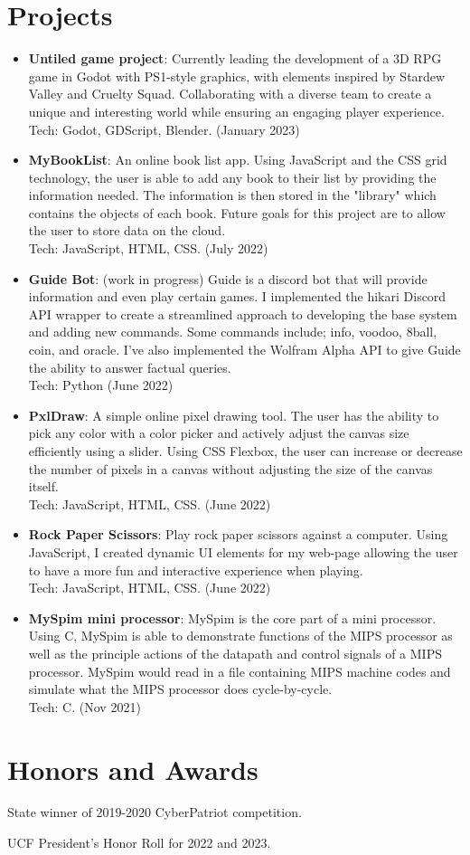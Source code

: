 \documentclass[a4paper,20pt]{article}
\newcommand{\resumeItem}[2]{
  \item\normalsize{
    \textbf{#1}{: #2 \vspace{1pt}}
  }
}
\newcommand{\resumeSubItem}[2]{\resumeItem{#1}{#2}\vspace{1pt}}
\newcommand{\resumeSubHeadingListStart}{\begin{itemize}[leftmargin=*]}
\newcommand{\resumeSubHeadingListEnd}{\end{itemize}}
\begin{document}
    
    \section{Projects}
        \resumeSubHeadingListStart
            \resumeSubItem{Untiled game project}{Currently leading the development of a 3D RPG game in Godot with PS1-style graphics, with elements inspired by Stardew Valley and Cruelty Squad. Collaborating with a diverse team to create a unique and interesting world while ensuring an engaging player experience.\\Tech: Godot, GDScript, Blender. (January 2023)}
            \resumeSubItem{MyBookList}{An online book list app. Using JavaScript and the CSS grid technology, the user is able to add any book to their list by providing the information needed. The information is then stored in the "library" which contains the objects of each book. Future goals for this project are to allow the user to store data on the cloud.\\Tech: JavaScript, HTML, CSS. (July 2022)}
            \resumeSubItem{Guide Bot}{(work in progress) Guide is a discord bot that will provide information and even play certain games. I implemented the hikari Discord API wrapper to create a streamlined approach to developing the base system and adding new commands. Some commands include; info, voodoo, 8ball, coin, and oracle. I've also implemented the Wolfram Alpha API to give Guide the ability to answer factual queries.\\Tech: Python (June 2022)}
            \resumeSubItem{PxlDraw}{A simple online pixel drawing tool. The user has the ability to pick any color with a color picker and actively adjust the canvas size efficiently using a slider. Using CSS Flexbox, the user can increase or decrease the number of pixels in a canvas without adjusting the size of the canvas itself.\\Tech: JavaScript, HTML, CSS. (June 2022)}
            \resumeSubItem{Rock Paper Scissors}{Play rock paper scissors against a computer. Using JavaScript, I created dynamic UI elements for my web-page allowing the user to have a more fun and interactive experience when playing.\\Tech: JavaScript, HTML, CSS. (June 2022)}
            \resumeSubItem{MySpim mini processor}{MySpim is the core part of a mini processor. Using C, MySpim is able to demonstrate functions of the MIPS processor as well as the principle actions of the datapath and control signals of a MIPS processor. MySpim would read in a file containing MIPS machine codes and simulate what the MIPS processor does cycle-by-cycle.\\Tech: C. (Nov 2021)}
            \vspace{2pt}
        \resumeSubHeadingListEnd
    
    
    \section{Honors and Awards}
        \begin{description}[font=$\bullet$]
            \item {State winner of 2019-2020 CyberPatriot competition.}
            \item {UCF President's Honor Roll for 2022 and 2023.}
        \end{description}
        
\end{document}
